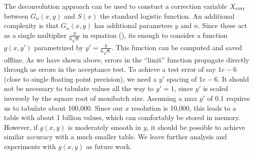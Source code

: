 \documentclass{article}
\begin{document}
The deconvolution approach can be used to constuct a correction
variable $X_{\rm corr}$ between $G_n(x,y)$ and $S(x)$ the standard
logistic function. An additional complexity is that $G_n(x,y)$ has
additional parameters $y$ and $n$. Since these act as a single
multiplier $\frac{y}{6\sqrt{n}}$ in equation
(\label{eq:GNderivatives}), its enough to consider a function
$g(x,y')$ parametrized by $y'= \frac{y}{6\sqrt{n}}$. This function can
be computed and saved offline. As we have shown above, errors in the
``limit'' function propagate directly through as errors in the
acceptance test.  To achieve a test error of say $1e-6$ (close to single
floating point precision), we need a $y'$ spacing of $1e-6$. It
should not be necessary to tabulate values all the way to $y'=1$,
since $y'$ is scaled inversely by the square root of monibatch size.
Assuming a max $y'$ of 0.1 requires us to tabulate about 100,000.
Since our $x$ resolution is 10,000, this leads to a table with about
1 billion values, which can comfortably be stored in memory. However,
if $g(x,y)$ is moderately smooth in $y$, it should be possible to
achieve similar accuracy with a much smaller table. We leave further
analysis and experiments with $g(x,y)$ as future work. 



\end{document}

